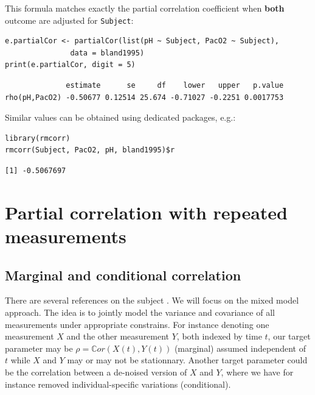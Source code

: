 \documentclass[12pt]{article}
\begin{document}
This formula matches exactly the partial correlation coefficient when
\textbf{both} outcome are adjusted for \texttt{Subject}:
\lstset{language=r,label= ,caption= ,captionpos=b,numbers=none}
\begin{lstlisting}
e.partialCor <- partialCor(list(pH ~ Subject, PacO2 ~ Subject),
			   data = bland1995)
print(e.partialCor, digit = 5)
\end{lstlisting}

\begin{verbatim}
              estimate      se     df    lower   upper   p.value
rho(pH,PacO2) -0.50677 0.12514 25.674 -0.71027 -0.2251 0.0017753
\end{verbatim}


Similar values can be obtained using dedicated packages, e.g.:
\lstset{language=r,label= ,caption= ,captionpos=b,numbers=none}
\begin{lstlisting}
library(rmcorr)
rmcorr(Subject, PacO2, pH, bland1995)$r
\end{lstlisting}

\begin{verbatim}
[1] -0.5067697
\end{verbatim}


\clearpage

\section{Partial correlation with repeated measurements}
\label{sec:org0d803cc}

\subsection{Marginal and conditional correlation}
\label{sec:org1d15c34}
There are several references on the subject
\citep{bland1995calculating,Lipsitz2001partial,bakdash2017repeated,shan2020correlation}. We
will focus on the mixed model approach. The idea is to jointly model
the variance and covariance of all measurements under appropriate
constrains. For instance denoting one measurement \(X\) and the other
measurement \(Y\), both indexed by time \(t\), our target parameter
may be \(\rho = \mathbb{C}or(X(t),Y(t))\) (marginal) assumed independent of
\(t\) while \(X\) and \(Y\) may or may not be stationnary. Another
target parameter could be the correlation between a de-noised version
of \(X\) and \(Y\), where we have for instance removed
individual-specific variations (conditional).

\bigskip
\end{document}
